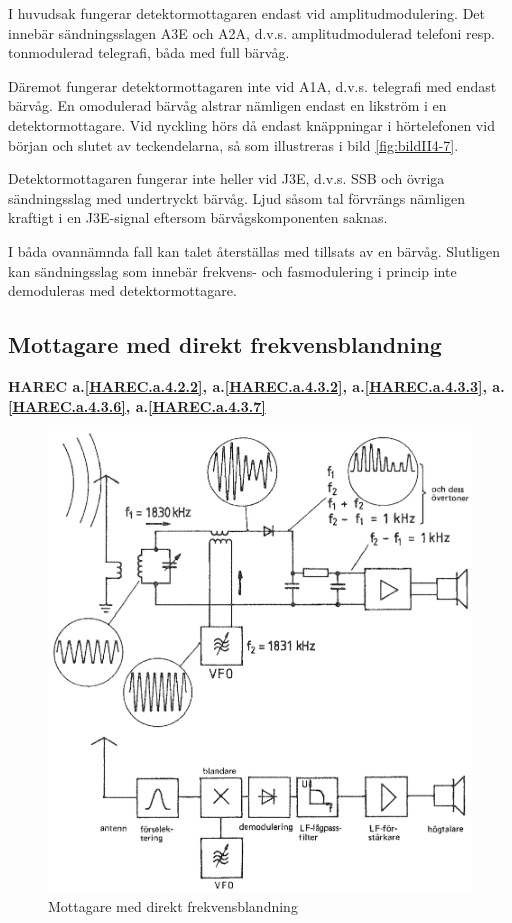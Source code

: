 I huvudsak fungerar detektormottagaren endast vid amplitudmodulering.
Det innebär sändningsslagen A3E och A2A, d.v.s. amplitudmodulerad telefoni
resp. tonmodulerad telegrafi, båda med full bärvåg.

Däremot fungerar detektormottagaren inte vid A1A, d.v.s. telegrafi med
endast bärvåg.
En omodulerad bärvåg alstrar nämligen endast en likström i en
detektormottagare.
Vid nyckling hörs då endast knäppningar i hörtelefonen vid början och
slutet av teckendelarna, så som illustreras i bild \ref{fig:bildII4-7}.

Detektormottagaren fungerar inte heller vid J3E, d.v.s. SSB och övriga
sändningsslag med undertryckt bärvåg.
Ljud såsom tal förvrängs nämligen kraftigt i en J3E-signal eftersom
bärvågskomponenten saknas.

I båda ovannämnda fall kan talet återställas med tillsats av en bärvåg.
Slutligen kan sändningsslag som innebär frekvens- och fasmodulering i
princip inte demoduleras med detektormottagare.

\subsection{Mottagare med direkt frekvensblandning}
\textbf{HAREC a.\ref{HAREC.a.4.2.2}\label{myHAREC.a.4.2.2},
a.\ref{HAREC.a.4.3.2}\label{myHAREC.a.4.3.2},
a.\ref{HAREC.a.4.3.3}\label{myHAREC.a.4.3.3},
a.\ref{HAREC.a.4.3.6}\label{myHAREC.a.4.3.6},
a.\ref{HAREC.a.4.3.7}\label{myHAREC.a.4.3.7}
}
\index{}

\begin{figure}
  \includegraphics[width=\textwidth]{images/cropped_pdfs/bild_2_4-08.pdf}
  \caption{Mottagare med direkt frekvensblandning}
  \label{fig:bildII4-8}
\end{figure}

